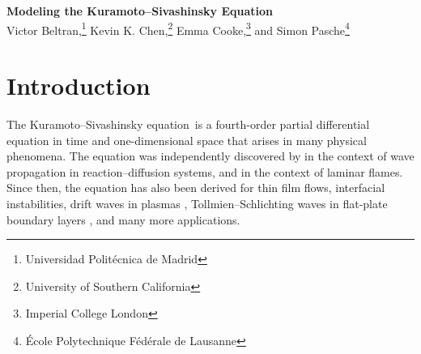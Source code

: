 \documentclass[11pt]{article}
\newcommand{\KSE}{Kuramoto--Sivashinsky equation}
\begin{document}
\begin{center}
    {\bf \Large Modeling the Kuramoto--Sivashinsky Equation}\\
    \vspace{0.3cm}
    {%
        \large{%
            Victor Beltran,\footnote{Universidad Polit\'ecnica de Madrid}
            Kevin K. Chen,\footnote{University of Southern California}
            Emma Cooke,\footnote{Imperial College London} and
            Simon Pasche\footnote{\'Ecole Polytechnique F\'ed\'erale de Lausanne}%
        }%
    }
\end{center}
\vspace{0.3cm}

\begin{abstract}
    We investigate the nonlinear dynamics and modeling of the \KSE.
    Both the common parallel equation with periodic boundary conditions, as well as a non-parallel equation on an infinite domain, are considered.
    In both equations, we report three cases where the stable solution is the trivial solution, a simple periodic orbit of a single frequency, and a more complex periodic orbit exhibiting multiple harmonics.
    In particular, the parallel periodic equation has analytical eigenvalues and eigenmodes, which allow an simple characterization of the Hopf bifurcation.
    The various types of solutions are demonstrated with phase portraits.
    Next, we compute POD-DEIM modes and reduced-order models for the parallel equation.
    Not only does POD-DEIM capture the limit cycle with a comparatively small number of modes, but also, transient modes correctly capture the limit cycle, and limit cycle modes correctly capture the transients.
\end{abstract}

\section{Introduction}

The \KSE\ is a fourth-order partial differential equation in time and one-dimensional space that arises in many physical phenomena.
The equation was independently discovered by \cite{KuramotoPTP76} in the context of wave propagation in reaction--diffusion systems, and \cite{SivashinskyAA77} in the context of laminar flames.
Since then, the equation has also been derived for thin film flows, interfacial instabilities, drift waves in plasmas \citep[see][]{KevrekidisSIAMJAM90}, Tollmien--Schlichting waves in flat-plate boundary layers \citep{FabbianeAMR14}, and many more applications.
\end{document}
